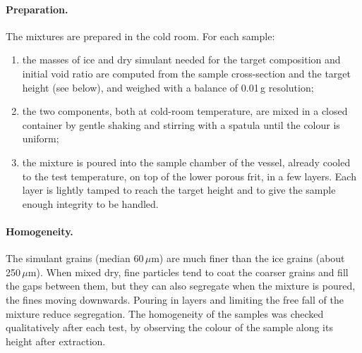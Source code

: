 \paragraph{Preparation.} The mixtures are prepared in the cold room. For each sample:
\begin{enumerate}
    \item the masses of ice and dry simulant needed for the target composition and initial void ratio are computed from the sample cross-section and the target height (see below), and weighed with a balance of 0.01\,g resolution;
    \item the two components, both at cold-room temperature, are mixed in a closed container by gentle shaking and stirring with a spatula until the colour is uniform;
    \item the mixture is poured into the sample chamber of the vessel, already cooled to the test temperature, on top of the lower porous frit, in a few layers. Each layer is lightly tamped to reach the target height and to give the sample enough integrity to be handled.
\end{enumerate}

\paragraph{Homogeneity.} The simulant grains (median 60\,$\mu$m) are much finer than the ice grains (about 250\,$\mu$m). When mixed dry, fine particles tend to coat the coarser grains and fill the gaps between them, but they can also segregate when the mixture is poured, the fines moving downwards. Pouring in layers and limiting the free fall of the mixture reduce segregation. The homogeneity of the samples was checked qualitatively after each test, by observing the colour of the sample along its height after extraction.

